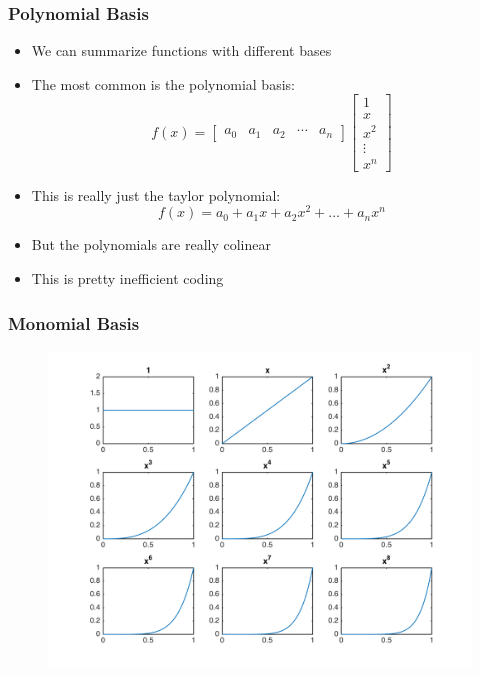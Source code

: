 \documentclass{beamer}
\begin{document}
\begin{frame}
\frametitle[alignment=center]{Polynomial Basis}
\begin{itemize}
\item We can summarize functions with different bases
\bigskip
\item The most common is the polynomial basis:
\bigskip
 $$f(x) = \left[\begin{array}{ccccc}a_0 & a_1 & a_2 & \cdots & a_n\end{array}\right]\left[\begin{array}{cccc}1 \\ x \\ x^2 \\ \vdots \\ x^{n}\end{array}\right]$$
 \bigskip
\item This is really just the taylor polynomial:
\bigskip
$$f(x)=a_0+a_1x+a_2x^2+...+a_nx^n$$
\bigskip
\item But the polynomials are really colinear
\bigskip
\item This is pretty inefficient coding
\end{itemize}
\end{frame}

\begin{frame}
\frametitle[alignment=center]{Monomial Basis}
\begin{figure}
\centering
\includegraphics[scale=0.5]{Bases_Monomial.png}
\end{figure}
\end{frame}
\end{document}
